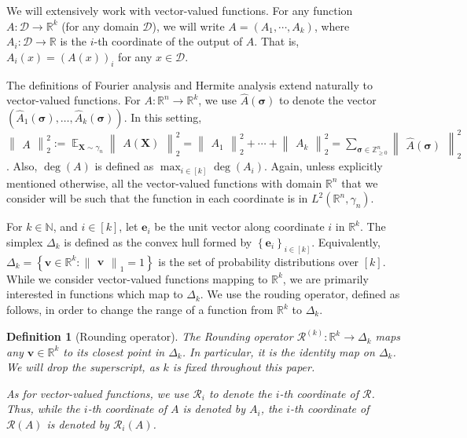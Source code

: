\documentclass[11pt]{article}
\newcommand{\inbrace}[1]{\left \{ #1 \right \}}
\newcommand{\inparen}[1]{\left ( #1 \right )}
\newcommand{\norm}[2]{\begin{Vmatrix} #2 \end{Vmatrix}_{#1}}
\newcommand{\set}[1]{\inbrace{#1}}
\newcommand{\setdef}[2]{\set{#1 : #2}}
\DeclareMathOperator*{\Ex}{\mathbb{E}}
\newcommand{\what}[1]{\widehat{#1}}
\newcommand{\bbN}{{\mathbb N}}
\newcommand{\bbR}{{\mathbb R}}
\newcommand{\bbZ}{{\mathbb Z}}
\newcommand{\be}{{\bm e}}
\newcommand{\bu}{{\bm u}}
\newcommand{\bv}{{\bm v}}
\newcommand{\bX}{\mathbf{X}}
\newcommand{\bsigma}{{\boldsymbol \sigma}}
\newcommand{\calD}{\mathcal{D}}
\newcommand{\calR}{\mathcal{R}}
\newtheorem{defn}[theorem]{Definition}
\newtheorem{fact}[theorem]{Fact}
\begin{document}
We will extensively work with vector-valued functions. For any function $A : \calD \to \bbR^k$ (for any domain $\calD$), we will write $A = (A_1, \cdots, A_k)$, where $A_i : \calD \to \bbR$ is the $i$-th coordinate of the output of $A$. That is, $A_i(x) = (A(x))_i$ for any $x \in \calD$.

The definitions of Fourier analysis and Hermite analysis extend naturally to vector-valued functions. For $A : \bbR^n \to \bbR^k$, we use $\what{A}(\bsigma)$ to denote the vector $\inparen{\what{A}_1(\bsigma), \ldots, \what{A}_k(\bsigma)}$. In this setting, $\norm{2}{A}^2 := \Ex_{\bX \sim \gamma_n} \norm{2}{A(\bX)}^2 = \norm{2}{A_1}^2 + \cdots + \norm{2}{A_k}^2 = \sum_{\bsigma \in \bbZ_{\ge 0}^n} \norm{2}{\what{A}(\bsigma)}^2$. Also, $\deg(A)$ is defined as $\max_{i \in [k]} \deg(A_i)$. Again, unless explicitly mentioned otherwise, all the vector-valued functions with domain $\bbR^n$ that we consider will be such that the function in each coordinate is in $L^2(\bbR^n, \gamma_n)$.

For $k \in \bbN$, and $i \in [k]$, let $\be_i$ be the unit vector along coordinate $i$ in $\bbR^k$. The simplex $\Delta_k$ is defined as the convex hull formed by $\set{\be_i}_{i \in [k]}$. Equivalently, $\Delta_k = \setdef{\bv \in \bbR^k}{\norm{1}{\bv} = 1}$ is the set of probability distributions over $[k]$. While we consider vector-valued functions mapping to $\bbR^k$, we are primarily interested in functions which map to $\Delta_k$. We use the rouding operator, defined as follows, in order to change the range of a function from $\bbR^k$ to $\Delta_k$.

\begin{defn}[Rounding operator]\label{def:rounding_op}
	The {\em Rounding operator} $\calR^{(k)} : \bbR^k \to \Delta_k$ maps any $\bv \in \bbR^k$ to its closest point in $\Delta_k$. In particular, it is the identity map on $\Delta_k$. We will drop the superscript, as $k$ is fixed throughout this paper.
	
	As for vector-valued functions, we use $\calR_i$ to denote the $i$-th coordinate of $\calR$. Thus, while the $i$-th coordinate of $A$ is denoted by $A_i$, the $i$-th coordinate of $\calR(A)$ is denoted by $\calR_i(A)$.
\end{defn}

\end{document}
